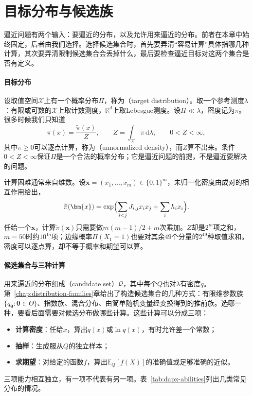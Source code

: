 \section{目标分布与候选族}
\label{sec:dapx-target-candidates}

逼近问题有两个输入：要逼近的分布，以及允许用来逼近的分布。前者在本章中始终固定，后者由我们选择。选择候选集合时，首先要弄清“容易计算”具体指哪几种计算，其次要弄清限制候选集合会丢掉什么，最后要检查逼近目标对这两个集合是否有定义。

\paragraph{目标分布}
设取值空间$\mathcal{X}$上有一个概率分布$\Pi$，称为（target distribution）。取一个参考测度$\lambda$：有限或可数的$\mathcal{X}$上取计数测度，$\mathbb{R}^{d}$上取Lebesgue测度。设$\Pi\ll\lambda$，密度记为$\pi$。很多时候我们只知道
\begin{equation}
 \pi(x)=\frac{\widetilde{\pi}(x)}{Z},\qquad Z=\int_{\mathcal{X}}\widetilde{\pi}\,\mathrm{d}\lambda,\qquad 0<Z<\infty ,
 \label{eq:dapx-unnormalized}
\end{equation}
其中$\widetilde{\pi}\geq0$可以逐点计算，称为（unnormalized density），而$Z$算不出来。条件$0<Z<\infty$保证$\Pi$是一个合法的概率分布；它是逼近问题的前提，不是逼近要解决的问题。

计算困难通常来自维数。设$\bm{x}=(x_1,\dots,x_m)\in\{0,1\}^{m}$，未归一化密度由成对的相互作用给出，
\[
 \widetilde{\pi}(\bm{x})=\exp\Bigl(\sum_{i<j}J_{i,j}x_ix_j+\sum_{i}h_ix_i\Bigr) .
\]
任给一个$\bm{x}$，计算$\widetilde{\pi}(\bm{x})$只需要做$m(m-1)/2+m$次乘加。$Z$却是$2^{m}$项之和，$m=50$时约$10^{15}$项；边缘概率$\Pi(X_1=1)$也要对其余$49$个分量的$2^{49}$种取值求和。密度可以逐点算，却不等于概率和期望可以算。

\paragraph{候选集合与三种计算}
用来逼近的分布组成（candidate set）$\mathcal{Q}$，其中每个$Q$也对$\lambda$有密度$q$。第~\ref{chap:distribution-families}章给出了构造候选集合的几种方式：有限维参数族$\{q_{\bm{\theta}}:\bm{\theta}\in\Theta\}$、指数族、混合分布、由简单随机变量经变换得到的推前族。选哪一种，要看后面需要对候选分布做哪些计算。这些计算可以分成三项：
\begin{itemize}
 \item \textbf{计算密度}：任给$x$，算出$q(x)$或$\ln q(x)$，有时允许差一个常数；
 \item \textbf{抽样}：生成服从$Q$的独立样本；
 \item \textbf{求期望}：对给定的函数$f$，算出$\mathbb{E}_{Q}[f(X)]$的准确值或足够准确的近似。
\end{itemize}
三项能力相互独立，有一项不代表有另一项。表~\ref{tab:dapx-abilities}列出几类常见分布的情况。

